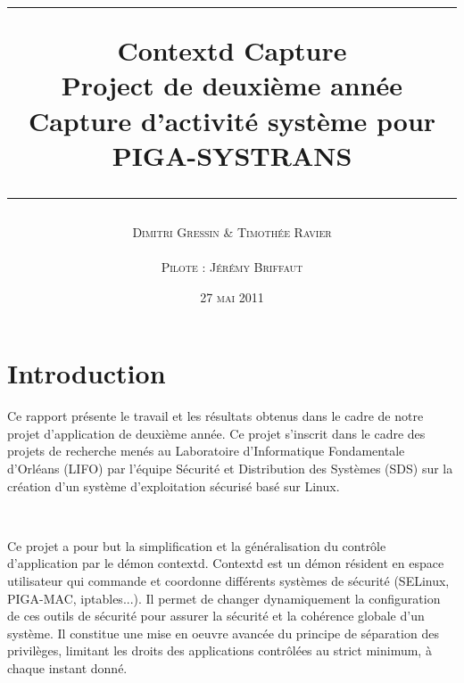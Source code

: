 \documentclass[pdftex,a4paper,titlepage,11pt]{article}
\newcommand{\nom}[1]{\textsc{#1}}
\newcommand{\ligne}[1][1pt]{
  \par\noindent
  \rule[.5ex]{\linewidth}{#1}\par}
\newcommand{\clearemptydoublepage}{
	\newpage{\pagestyle{empty}\cleardoublepage}}
\begin{document}
\setlength{\parskip}{2.4ex}

\title{
\ligne{\Large}
\textbf{Contextd Capture}\\
\textbf{Project de deuxième année}\\
\Large Capture d'activité système pour PIGA-SYSTRANS
\ligne{\Large}
}
\author{\nom{Dimitri Gressin} \& \nom{Timothée Ravier}\\\\\nom{Pilote : Jérémy Briffaut}}
\date{27 \textsc{mai} 2011}

\maketitle

\clearemptydoublepage

\setcounter{secnumdepth}{3}
\setcounter{tocdepth}{2}
\tableofcontents
\addtocounter{page}{-1}

\newpage

\section*{Introduction} 
Ce rapport présente le travail et les résultats obtenus dans le cadre de notre projet d'application de deuxième année. Ce projet s'inscrit dans le cadre des projets de recherche menés au Laboratoire d'Informatique Fondamentale d'Orléans (LIFO) par l'équipe Sécurité et Distribution des Systèmes (SDS) sur la création d'un système d'exploitation sécurisé basé sur Linux.

~

Ce projet a pour but la simplification et la généralisation du contrôle d'application par le démon contextd. Contextd est un démon résident en espace utilisateur qui commande et coordonne différents systèmes de sécurité (SELinux, PIGA-MAC, iptables...). Il permet de changer dynamiquement la configuration de ces outils de sécurité pour assurer la sécurité et la cohérence globale d'un système. Il constitue une mise en oeuvre avancée du principe de séparation des privilèges, limitant les droits des applications contrôlées au strict minimum, à chaque instant donné.

~
\end{document}
